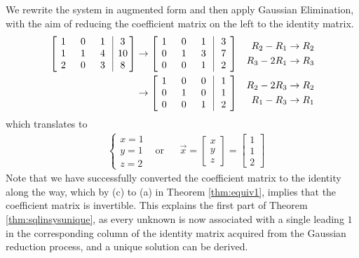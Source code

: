 \begin{solution}
We rewrite the system in augmented form and then apply Gaussian Elimination, with the aim of reducing the coefficient matrix on the left to the identity matrix.
\begin{align*}
\left[\begin{array}{@{\,}wc{10pt}wc{10pt}wc{10pt}|wc{10pt}@{\,}}
1 & 0 & 1 & 3 \\
1 & 1 & 4 & 10 \\
2 & 0 & 3 & 8
\end{array}\right] 
& \to 
\left[\begin{array}{@{\,}wc{10pt}wc{10pt}wc{10pt}|wc{10pt}@{\,}}
1 & 0 & 1 & 3 \\
0 & 1 & 3 & 7 \\
0 & 0 & 1 & 2
\end{array}\right] 
& \begin{aligned}
R_2-R_1 &\to R_2 \\
R_3-2R_1 &\to R_3 
\end{aligned} \\
& \to 
\left[\begin{array}{@{\,}wc{10pt}wc{10pt}wc{10pt}|wc{10pt}@{\,}}
1 & 0 & 0 & 1 \\
0 & 1 & 0 & 1 \\
0 & 0 & 1 & 2
\end{array}\right] 
& 
\begin{aligned}
R_2-2R_3 &\to R_2 \\
R_1-R_3 &\to R_1    
\end{aligned}
\end{align*}
which translates to
\begin{align*}
&
\begin{cases}
x = 1 \\
y = 1 \\
z = 2
\end{cases}
& \text{or} &
& \vec{x} = 
\begin{bmatrix}
x \\
y \\
z
\end{bmatrix}
=
\begin{bmatrix}
1 \\
1 \\
2
\end{bmatrix}
\end{align*}
Note that we have successfully converted the coefficient matrix to the identity along the way, which by (c) to (a) in Theorem \ref{thm:equiv1}, implies that the coefficient matrix is invertible. This explains the first part of Theorem \ref{thm:sqlinsysunique}, as every unknown is now associated with a single leading $1$ in the corresponding column of the identity matrix acquired from the Gaussian reduction process, and a unique solution can be derived.
\end{solution}

